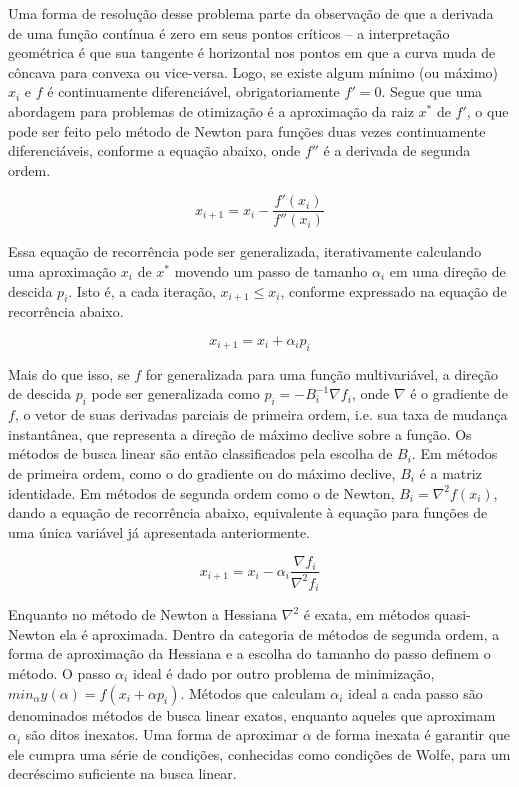\documentclass[cic,tc]{iiufrgs}
\begin{document}
Uma forma de resolução desse problema parte da observação de que a derivada de
uma função contínua é zero em seus pontos críticos -- a interpretação
geométrica é que sua tangente é horizontal nos pontos em que a curva muda de
côncava para convexa ou vice-versa. Logo, se existe algum mínimo (ou máximo)
$x_i$ e $f$ é continuamente diferenciável, obrigatoriamente $f' = 0$. Segue que
uma abordagem para problemas de otimização é a aproximação da raiz $x^*$ de
$f'$, o que pode ser feito pelo método de Newton para funções duas vezes
continuamente diferenciáveis, conforme a equação abaixo, onde $f''$ é a
derivada de segunda ordem.

$$ x_{i + 1} = x_i - \frac{f'(x_i)}{f''(x_i)} $$

Essa equação de recorrência pode ser generalizada, iterativamente calculando
uma aproximação $x_i$ de $x^*$ movendo um passo de tamanho $\alpha_i$ em uma
direção de descida $p_i$. Isto é, a cada iteração, $x_{i+1} \le x_i$, conforme
expressado na equação de recorrência abaixo.

$$ x_{i + 1} = x_i + \alpha_i p_i $$

Mais do que isso, se $f$ for generalizada para uma função multivariável, a
direção de descida $p_i$ pode ser generalizada como $p_i = -B_{i}^{-1} \nabla
f_i$, onde $\nabla$ é o gradiente de $f$, o vetor de suas derivadas parciais de
primeira ordem, i.e. sua taxa de mudança instantânea, que representa a direção
de máximo declive sobre a função. Os métodos de busca linear são então
classificados pela escolha de $B_i$. Em métodos de primeira ordem, como o do
gradiente ou do máximo declive, $B_i$ é a matriz identidade. Em métodos de
segunda ordem como o de Newton, $B_i = \nabla^2 f(x_i)$, dando a equação de
recorrência abaixo, equivalente à equação para funções de uma única variável já
apresentada anteriormente.

$$ x_{i + 1} = x_i - \alpha_i \frac{\nabla f_i}{\nabla^2 f_i} $$

Enquanto no método de Newton a Hessiana $\nabla^2$ é exata, em métodos
quasi-Newton ela é aproximada. Dentro da categoria de métodos de segunda ordem,
a forma de aproximação da Hessiana e a escolha do tamanho do passo definem o
método. O passo $\alpha_i$ ideal é dado por outro problema de minimização,
$min_\alpha y(\alpha) = f(x_i + \alpha p_i)$. Métodos que calculam $\alpha_i$
ideal a cada passo são denominados métodos de busca linear exatos, enquanto
aqueles que aproximam $\alpha_i$ são ditos inexatos. Uma forma de aproximar
$\alpha$ de forma inexata é garantir que ele cumpra uma série de condições,
conhecidas como condições de Wolfe, para um decréscimo suficiente na busca
linear.
\end{document}
